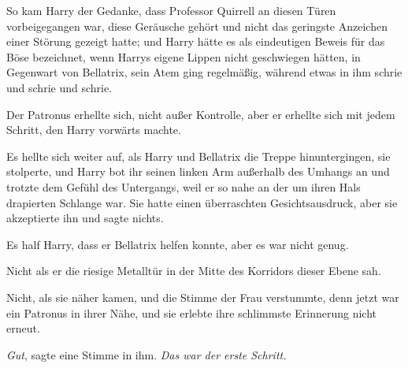 So kam Harry der Gedanke, dass Professor Quirrell an diesen Türen vorbeigegangen war, diese Geräusche gehört und nicht das geringste Anzeichen einer Störung gezeigt hatte; und Harry hätte es als eindeutigen Beweis für das Böse bezeichnet, wenn Harrys eigene Lippen nicht geschwiegen hätten, in Gegenwart von Bellatrix, sein Atem ging regelmäßig, während etwas in ihm schrie und schrie und schrie.

Der Patronus erhellte sich, nicht außer Kontrolle, aber er erhellte sich mit jedem Schritt, den Harry vorwärts machte.

Es hellte sich weiter auf, als Harry und Bellatrix die Treppe hinuntergingen, sie stolperte, und Harry bot ihr seinen linken Arm außerhalb des Umhangs an und trotzte dem Gefühl des Untergangs, weil er so nahe an der um ihren Hals drapierten Schlange war. Sie hatte einen überraschten Gesichtsausdruck, aber sie akzeptierte ihn und sagte nichts.

Es half Harry, dass er Bellatrix helfen konnte, aber es war nicht genug.

Nicht als er die riesige Metalltür in der Mitte des Korridors dieser Ebene sah.

Nicht, als sie näher kamen, und die Stimme der Frau verstummte, denn jetzt war ein Patronus in ihrer Nähe, und sie erlebte ihre schlimmste Erinnerung nicht erneut.

\emph{Gut}, sagte eine Stimme in ihm. \emph{Das war der erste Schritt.}

